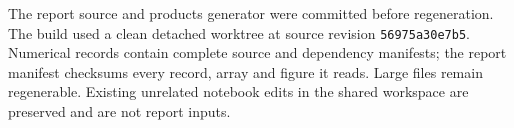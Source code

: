 The report source and products generator were committed before regeneration. The build used a clean detached worktree at source revision \texttt{56975a30e7b5}. Numerical records contain complete source and dependency manifests; the report manifest checksums every record, array and figure it reads. Large files remain regenerable. Existing unrelated notebook edits in the shared workspace are preserved and are not report inputs.
